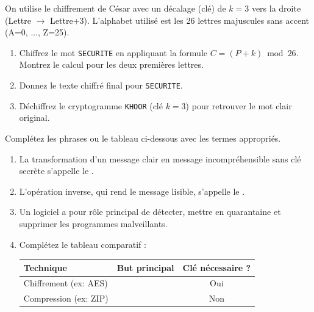 \documentclass[11pt]{article}
\begin{document}
\begin{exercice}
On utilise le chiffrement de César avec un décalage (clé) de \textbf{$k = 3$} vers la droite (Lettre $\rightarrow$ Lettre+3). L'alphabet utilisé est les 26 lettres majuscules sans accent (A=0, ..., Z=25).
\begin{enumerate}
    \item Chiffrez le mot \texttt{SECURITE} en appliquant la formule $C = (P + k) \bmod 26$. Montrez le calcul pour les deux premières lettres.
    \item Donnez le texte chiffré final pour \texttt{SECURITE}.
    \item Déchiffrez le cryptogramme \texttt{KHOOR} (clé $k=3$) pour retrouver le mot clair original.
\end{enumerate}
\end{exercice}

\begin{exercice}
Complétez les phrases ou le tableau ci-dessous avec les termes appropriés.
\begin{enumerate}
    \item La transformation d'un message clair en message incompréhensible sans clé secrète s'appelle le \underline{\hspace{4cm}}.
    \item L'opération inverse, qui rend le message lisible, s'appelle le \underline{\hspace{4cm}}.
    \item Un logiciel \underline{\hspace{4cm}} a pour rôle principal de détecter, mettre en quarantaine et supprimer les programmes malveillants.
    \item Complétez le tableau comparatif :
    \begin{center}
    \begin{tabular}{|l|c|c|}
    \hline
    \textbf{Technique} & \textbf{But principal} & \textbf{Clé nécessaire ?} \\
    \hline
    Chiffrement (ex: AES) & \underline{\hspace{3cm}} & Oui \\
    \hline
    Compression (ex: ZIP) & \underline{\hspace{3cm}} & Non \\
    \hline
    \end{tabular}
    \end{center}
\end{enumerate}
\end{exercice}
\end{document}
